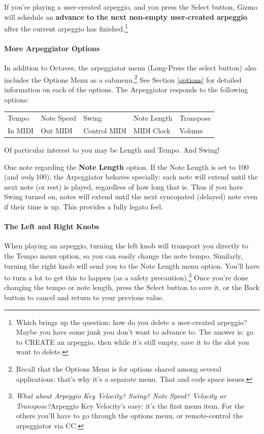 \documentclass{article}
\begin{document}
If you're playing a user-created arpeggio, and you press the Select button, Gizmo will schedule an {\bf advance to the next non-empty user-created arpeggio} after the current arpeggio has finished.\footnote{Which brings up the question: how do you delete a user-created arpeggio?  Maybe you have some junk you don't want to advance to.  The answer is: go to CREATE an arpeggio, then while it's still empty, save it to the slot you want to delete.}

\paragraph{More Arpeggiator Options}

In addition to Octaves, the arpeggiator menu (Long-Press the select button) also includes the Options Menu as a submenu.\footnote{Recall that the Options Menu is for options shared among several applications: that's why it's a separate menu.  That and code space issues.}  See Section \ref{options} for detailed information on each of the options.  The Arpeggiator responds to the following options:

\vspace{0.75em}
\begin{tabular}{lllll}
Tempo& Note Speed& Swing & Note Length&Transpose\\
In MIDI& Out MIDI&Control MIDI&MIDI Clock&Volume\\
\end{tabular}

\vspace{0.75em}
Of particular interest to you may be Length and Tempo.  And Swing!

One note regarding the {\bf Note Length} option.  If the Note Length is set to 100 (and {\it only} 100), the Arpeggiator behaves specially: each note will extend until the next note (or rest) is played, regardless of how long that is.  Thus if you have Swing turned on, notes will extend until the next syncopated (delayed) note even if their time is up. This provides a fully legato feel.


\paragraph{The Left and Right Knobs}  When playing an arpeggio, turning the left knob will transport you directly to the Tempo menu option, so you can easily change the note tempo.  Similarly, turning the right knob will send you to the Note Length menu option.  You'll have to turn a lot to get this to happen (as a safety precaution).\footnote{{\it What about Arpeggio Key Velocity?  Swing?  Note Speed? Velocity or Transpose?}\qquad Arpeggio Key Velocity's easy: it's the first menu item.  For the others you'll have to go through the options menu, or remote-control the arpeggiator via CC.}  Once you're done changing the tempo or note length, press the Select button to save it, or the Back button to cancel and return to your previous value.
\end{document}
